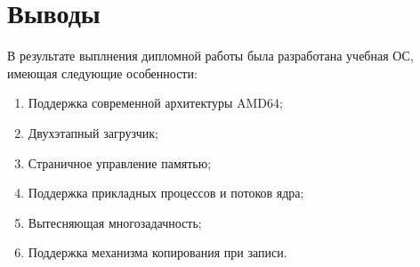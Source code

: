 \documentclass[12pt]{article}
\begin{document}
\section{\textbf{Выводы}}
В результате выплнения дипломной работы была разработана учебная ОС,
имеющая следующие особенности:

\begin{enumerate}
\item Поддержка современной архитектуры AMD64;
\item Двухэтапный загрузчик;
\item Страничное управление памятью;
\item Поддержка прикладных процессов и потоков ядра;
\item Вытесняющая многозадачность;
\item Поддержка механизма копирования при записи.
\end{enumerate}
\end{document}

